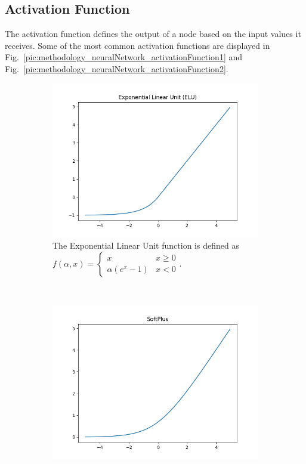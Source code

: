 \subsection{Activation Function}
The activation function defines the output of a node based on the input values it receives. Some of the most common activation functions are displayed in Fig.~\ref{pic:methodology_neuralNetwork_activationFunction1} and Fig.~\ref{pic:methodology_neuralNetwork_activationFunction2}.
\begin{figure}[h!]
	\centering
	\begin{subfigure}[t]{0.4\textwidth}
		\centering
		\includegraphics[width=\textwidth]{img/methodology_neuralNetwork_activationFunction_elu.png}
		\caption{The Exponential Linear Unit function is defined as $f(\alpha, x) = \begin{cases} x & x \geq 0 \\ \alpha (e^x - 1) & x < 0 \end{cases}$.}
	\end{subfigure}%
	~ 
	\begin{subfigure}[t]{0.4\textwidth}
		\centering
		\includegraphics[width=\textwidth]{img/methodology_neuralNetwork_activationFunction_softplus.png}

\end{subfigure}
\end{figure}
